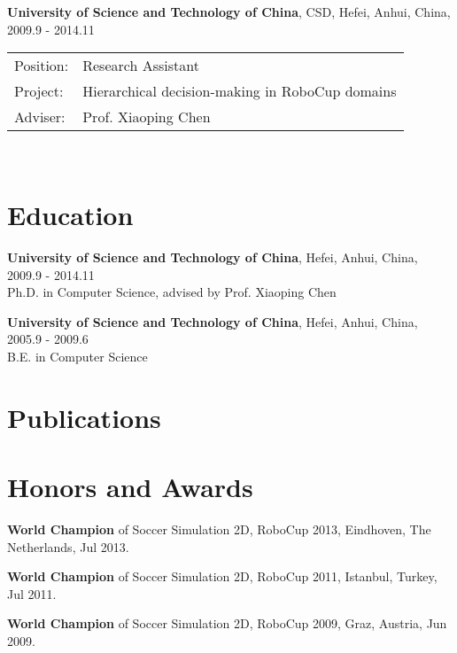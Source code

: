 \documentclass[letterpaper,10pt]{article}
\renewenvironment{itemize}{
  \begin{list}{}{
    \setlength{\leftmargin}{1.5em}
  }
}{
  \end{list}
}
\begin{document}
\begin{itemize}
	\item \textbf{University of Science and Technology of China}, CSD, Hefei, Anhui, China, 2009.9 - 2014.11 \\
	      \begin{tabular}{ll}
		      Position: & Research Assistant                              \\
		      Project:  & Hierarchical decision-making in RoboCup domains \\
		      Adviser:  & Prof. Xiaoping Chen                             \\
	      \end{tabular} \\
\end{itemize}

\vspace{10pt}
\section*{Education}
\begin{itemize}
	\item \textbf{University of Science and Technology of China}, Hefei, Anhui, China, 2009.9 - 2014.11 \\
	      Ph.D. in Computer Science, advised by Prof. Xiaoping Chen
	\item \textbf{University of Science and Technology of China}, Hefei, Anhui, China, 2005.9 - 2009.6 \\
	      B.E. in Computer Science
\end{itemize}

\vspace{10pt}
\section*{Publications}
\nocite{*}



\vspace{10pt}
\section*{Honors and Awards}
\begin{itemize}
	\item \textbf{World Champion} of Soccer Simulation 2D, RoboCup 2013, Eindhoven, The Netherlands, Jul 2013.
	\item \textbf{World Champion} of Soccer Simulation 2D, RoboCup 2011, Istanbul, Turkey, Jul 2011.
	\item \textbf{World Champion} of Soccer Simulation 2D, RoboCup 2009, Graz, Austria, Jun 2009.
\end{itemize}
\end{document}
